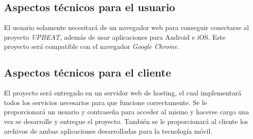 \documentclass{article}
\begin{document}
\subsection{Aspectos técnicos para el usuario}
El usuario solamente necesitará de un navegador web para conseguir conectarse al proyecto \textit{UPBEAT}, además de usar aplicaciones para Android e iOS.
Este proyecto será compatible con el navegador \textit{Google Chrome}.\vspace{0.5cm}
\hfill\break
\begin{figure}[H]
\end{figure}

\subsection{Aspectos técnicos para el cliente}
El proyecto será entregado en un servidor web de hosting, el cual implementará todos los servicios necesarios para que funcione correctamente. Se le proporcionará un usuario y contraseña para acceder al mismo y hacerse cargo una vez se desarrolle y entregue el proyecto.
\hfill \break
También se le proporcionará al cliente los archivos de ambas aplicaciones desarrolladas para la tecnología móvil.
\begin{figure}[H]
\end{figure}
\end{document}
